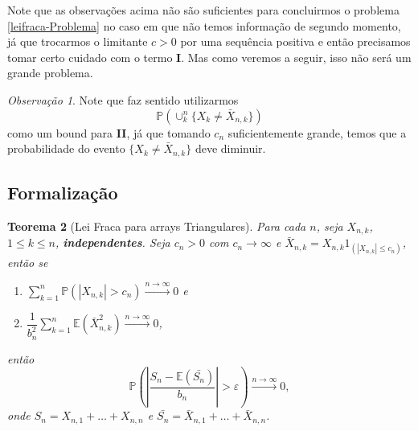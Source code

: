 \documentclass[12pt,a4paper,oneside]{book}
\newtheorem{theorem}{Teorema}[section]
\theoremstyle{definition}
\theoremstyle{remark}
\newtheorem{remark}[theorem]{Observa\c{c}\~ao}
\numberwithin{equation}{section}
\newcommand{\e}{\varepsilon}
\newcommand{\E}{\mathbb{E}}
\newcommand{\pr}{\mathbb{P}}
\begin{document}
Note que as observações acima não são suficientes para concluirmos o problema \ref{leifraca-Problema} no caso em que não temos informação de segundo momento, já que trocarmos o limitante $c>0$ por uma sequência positiva e então precisamos tomar certo cuidado com o termo \textbf{I}. Mas como veremos a seguir, isso não será um grande problema.

\begin{tcolorbox}[colback = yellow!60]
\begin{remark}Note que faz sentido utilizarmos 
$$\pr(\cup_k^n \{X_k\neq \bar{X}_{n,k}\})$$
como um bound para \textbf{II}, já que tomando $c_n$ suficientemente grande, temos que a probabilidade do evento $\{X_k \neq  \bar{X}_{n,k}\}$ deve diminuir.
\end{remark}
\end{tcolorbox}










\subsection{Formalização}
\begin{tcolorbox}
\begin{theorem}[Lei Fraca para arrays Triangulares]\label{leifraca-triang}
Para cada  $n$, seja  $X_{n,k}$, $1\leq k \leq n$, \textbf{independentes}. Seja $c_n>0$ com $c_n\rightarrow \infty$ e $\bar{X}_{n,k} = X_{n,k}1_{(|X_{n,k}|\leq c_n)}$, então se 
\begin{enumerate}
\item $ \sum_{k=1}^n \pr(|X_{n,k}|>c_n) \xrightarrow{n\rightarrow\infty} 0$ e 
\item $ \dfrac{1}{b_n^2}\sum_{k=1}^n \E(\bar{X}_{n,k}^2) \xrightarrow{n\rightarrow\infty} 0$,
\end{enumerate} 
então
$$\pr\left(\left|\dfrac{S_n-\E(\bar{S_n})}{b_n}\right|>\e \right) \xrightarrow{n\rightarrow \infty}0,$$
onde $S_n = X_{n,1}+\dots+X_{n,n}$ e  $\bar{S_n} = \bar{X}_{n,1}+\dots+\bar{X}_{n,n}$.

\end{theorem}
\end{tcolorbox}
\end{document}
